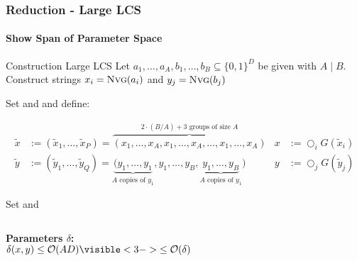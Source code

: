 \begin{frame}
\frametitle{Reduction - Large LCS}
\framesubtitle{Show Span of Parameter Space}


\begin{exampleblock}{Construction Large LCS}
Let  $a_1, \dots, a_A, b_1, \dots, b_B \subseteq \{0,1\}^D$ be given with $A \mid B$. 
Construct strings $x_i = \text{\textsc{Nvg}}(a_i)$ and $y_j = \text{\textsc{Nvg}}(b_j)$


Set  and  and define:
\vspace{-2ex}

\begin{align*}
\tilde{x} &:= (\tilde{x}_1, \ldots, \tilde{x}_P) = \overbrace{(x_1, \ldots, x_A, x_1, \ldots, x_A, \ldots, x_1, \ldots, x_A)}^{2 \cdot (B/A) + 3 \text{ groups of size } A} 	&	x &:= \bigcirc_i G(\tilde{x}_i)\\
%
\tilde{y} &:= (\tilde{y}_1, \ldots, \tilde{y}_Q) = \underbrace{(y_1, \ldots, y_1}_{A \text{ copies of } y_1}, y_1, \ldots, y_B, \underbrace{y_1, \ldots, y_B}_{A \text{ copies of } y_1})	&	y &:= \bigcirc_j G(\tilde{y}_j)
\end{align*}

Set  and 
\end{exampleblock}


\begin{columns}
\setlength{\parskip}{1em}
\textbf{Parameters $\delta$:}\\
$\delta(x,y) \leq \bigO{AD} \visible<3->{\leq \bigO{\delta}}$






\setlength{\parskip}{1em}


\end{columns}
\end{frame}
